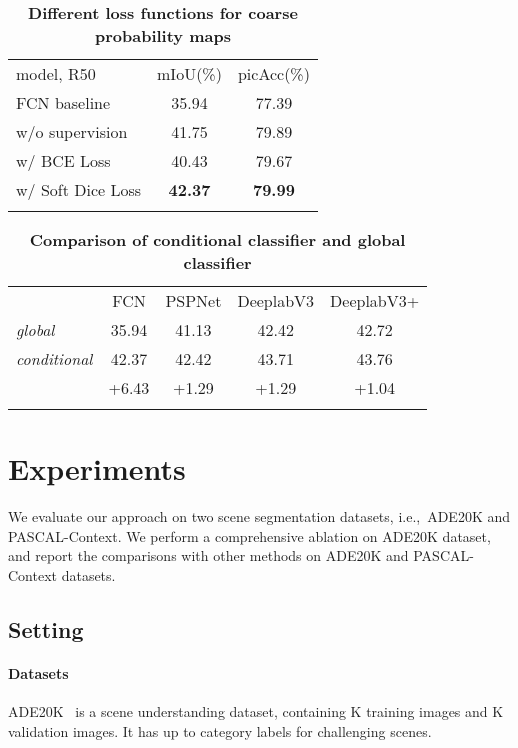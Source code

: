 \documentclass[journal]{IEEEtran}
\def\ie{i.e.,~}
\begin{document}
\begin{table}[t]
\centering
\setlength{\tabcolsep}{6.0pt}
\small
\renewcommand{\arraystretch}{1.4}
\caption{\textbf{Different loss functions for coarse probability maps}}
\label{tab:loss_function}
\begin{tabular}{l|c|c}
\shline
model, R50 & mIoU(\%) & picAcc(\%)\\ 
\shline
FCN baseline & 35.94 & 77.39 \\
\hline
w/o supervision & 41.75 & 79.89 \\
w/ BCE Loss & 40.43 & 79.67 \\
w/ Soft Dice Loss & \textbf{42.37} & \textbf{79.99} \\ 
\shline	
\end{tabular}
\end{table}	

\begin{table}[t]
\centering
\setlength{\tabcolsep}{5.0pt}
\small
\renewcommand{\arraystretch}{1.4}
\caption{\textbf{Comparison of conditional classifier and global classifier}}
\label{tab:cond_classifier}
\begin{tabular}{l|c|c|c|c}
\shline
\multicolumn{1}{c|}{classifier} & FCN & PSPNet & DeeplabV3 & DeeplabV3+ \\ 
\shline
\emph{global} &  35.94 & 41.13 & 42.42 & 42.72 \\
\emph{conditional} & 42.37 & 42.42 & 43.71 & 43.76 \\
\hline
 & +6.43 & +1.29 & +1.29 & +1.04 \\
\shline	
\end{tabular}
\end{table}	


\section{Experiments}
We evaluate our approach on two scene segmentation datasets, \ie ADE20K and PASCAL-Context.
We perform a comprehensive ablation
on ADE20K dataset, and
report the comparisons 
with other methods on ADE20K and PASCAL-Context datasets.

\subsection{Setting}
\paragraph{Datasets}
ADE20K~\cite{Zhou-ADE-2016} is a scene understanding dataset,
containing K training images and K validation images. 
It has up to  category labels for challenging scenes.
\end{document}

